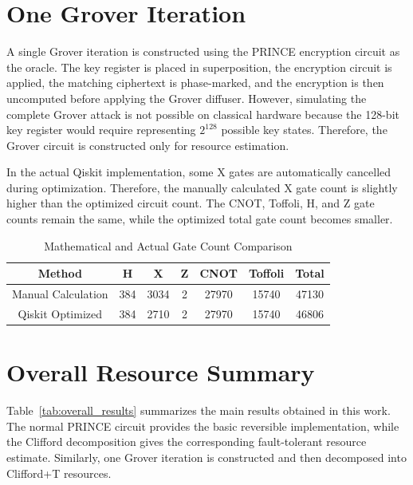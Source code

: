 \documentclass[12pt,a4paper]{report}
\begin{document}
\section{One Grover Iteration}

A single Grover iteration is constructed using the PRINCE encryption circuit as the oracle. The key register is placed in superposition, the encryption circuit is applied, the matching ciphertext is phase-marked, and the encryption is then uncomputed before applying the Grover diffuser. However, simulating the complete Grover attack is not possible on classical hardware because the 128-bit key register would require representing $2^{128}$ possible key states. Therefore, the Grover circuit is constructed only for resource estimation.

In the actual Qiskit implementation, some X gates are automatically cancelled during optimization. Therefore, the manually calculated X gate count is slightly higher than the optimized circuit count. The CNOT, Toffoli, H, and Z gate counts remain the same, while the optimized total gate count becomes smaller.

\begin{table}[H]
\centering
\caption{Mathematical and Actual Gate Count Comparison}
\label{tab:math_actual_comparison}
\begin{tabular}{|c|c|c|c|c|c|c|}
\hline
\textbf{Method} & \textbf{H} & \textbf{X} & \textbf{Z} & \textbf{CNOT} & \textbf{Toffoli} & \textbf{Total} \\
\hline
Manual Calculation & 384 & 3034 & 2 & 27970 & 15740 & 47130 \\
\hline
Qiskit Optimized & 384 & 2710 & 2 & 27970 & 15740 & 46806 \\
\hline
\end{tabular}
\end{table}

\section{Overall Resource Summary}

Table~\ref{tab:overall_results} summarizes the main results obtained in this work. The normal PRINCE circuit provides the basic reversible implementation, while the Clifford decomposition gives the corresponding fault-tolerant resource estimate. Similarly, one Grover iteration is constructed and then decomposed into Clifford+T resources.
\end{document}
